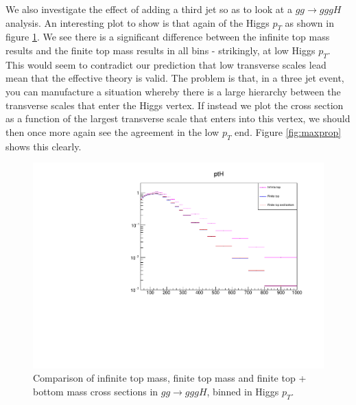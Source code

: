 We also investigate the effect of adding a third jet so as to look at a $gg \to gggH$ analysis. An interesting plot to show is that again of the Higgs $p_T$ as shown in figure \ref{fig:pth_gg_gggH}. We see there is a significant difference between the infinite top mass results and the finite top mass results in all bins - strikingly, at low Higgs $p_T$. This would seem to contradict our prediction that low transverse scales lead mean that the effective theory is valid. The problem is that, in a three jet event, you can manufacture a situation whereby there is a large hierarchy between the transverse scales that enter the Higgs vertex. If instead we plot the cross section as a function of the largest transverse scale that enters into this vertex, we should then once more again see the agreement in the low $p_T$ end. Figure \ref{fig:maxprop} shows this clearly. %

\begin{figure}[t]
\centering
\includegraphics[scale=0.72]{Images/ptH_3j.pdf}
\caption{Comparison of infinite top mass, finite top mass and finite top + bottom mass cross sections in $gg \to gggH$, binned in Higgs $p_T$. }
\label{fig:pth_gg_gggH}
\end{figure}

